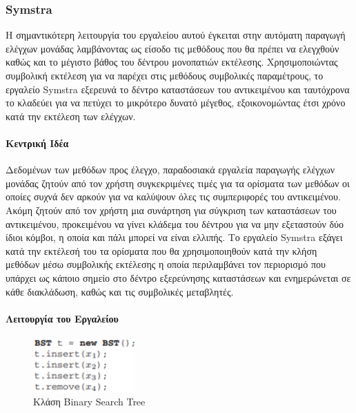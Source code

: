 \documentclass[12pt]{article}
\begin{document}
\subsubsection{Symstra} 

Η σημαντικότερη λειτουργία του εργαλείου αυτού έγκειται στην αυτόματη παραγωγή ελέγχων μονάδας λαμβάνοντας ως είσοδο τις μεθόδους που θα πρέπει να ελεγχθούν καθώς και το μέγιστο βάθος του δέντρου μονοπατιών εκτέλεσης. Χρησιμοποιώντας συμβολική εκτέλεση για να παρέχει στις μεθόδους συμβολικές παραμέτρους, το εργαλείο Symstra εξερευνά το δέντρο καταστάσεων του αντικειμένου και ταυτόχρονα το κλαδεύει για να πετύχει το μικρότερο δυνατό μέγεθος, εξοικονομώντας έτσι χρόνο κατά την εκτέλεση των ελέγχων.
\cite{tao}


\paragraph{Κεντρική Ιδέα}

Δεδομένων των μεθόδων προς έλεγχο, παραδοσιακά εργαλεία παραγωγής ελέγχων μονάδας ζητούν από τον χρήστη συγκεκριμένες τιμές για τα ορίσματα των μεθόδων οι οποίες συχνά δεν αρκούν για να καλύψουν όλες τις συμπεριφορές του αντικειμένου. Ακόμη ζητούν από τον χρήστη μια συνάρτηση για σύγκριση των καταστάσεων του αντικειμένου, προκειμένου να γίνει κλάδεμα του δέντρου για να μην εξεταστούν δύο ίδιοι κόμβοι, η οποία και πάλι μπορεί να είναι ελλιπής. Το εργαλείο Symstra εξάγει κατά την εκτέλεσή του τα ορίσματα που θα χρησιμοποιηθούν κατά την κλήση μεθόδων μέσω συμβολικής εκτέλεσης η οποία περιλαμβάνει τον περιορισμό που υπάρχει ως κάποιο σημείο στο δέντρο εξερεύνησης καταστάσεων και ενημερώνεται σε κάθε διακλάδωση, καθώς και τις συμβολικές μεταβλητές.

\paragraph{Λειτουργία του Εργαλείου}

\begin{figure}
\centering
    \includegraphics[width=0.35\textwidth]{bst_class.png}
    \caption{Κλάση Binary Search Tree}
    \label{fig:bst}
\end{figure}
\end{document}
